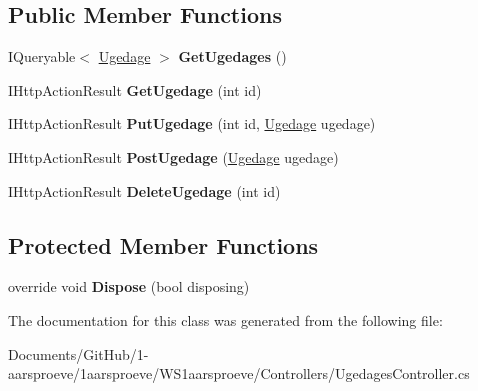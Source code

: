 \subsection*{Public Member Functions}
\begin{DoxyCompactItemize}
\item 
\hypertarget{class_w_s1aarsproeve_1_1_controllers_1_1_ugedages_controller_a6c5ea237cab963d71d3b92f381650efd}{}I\+Queryable$<$ \hyperlink{class_w_s1aarsproeve_1_1_ugedage}{Ugedage} $>$ {\bfseries Get\+Ugedages} ()\label{class_w_s1aarsproeve_1_1_controllers_1_1_ugedages_controller_a6c5ea237cab963d71d3b92f381650efd}

\item 
\hypertarget{class_w_s1aarsproeve_1_1_controllers_1_1_ugedages_controller_a6422d13a3d1b218f8a80454624de486b}{}I\+Http\+Action\+Result {\bfseries Get\+Ugedage} (int id)\label{class_w_s1aarsproeve_1_1_controllers_1_1_ugedages_controller_a6422d13a3d1b218f8a80454624de486b}

\item 
\hypertarget{class_w_s1aarsproeve_1_1_controllers_1_1_ugedages_controller_a13b35b6b510f7b41c9735d13442e3fde}{}I\+Http\+Action\+Result {\bfseries Put\+Ugedage} (int id, \hyperlink{class_w_s1aarsproeve_1_1_ugedage}{Ugedage} ugedage)\label{class_w_s1aarsproeve_1_1_controllers_1_1_ugedages_controller_a13b35b6b510f7b41c9735d13442e3fde}

\item 
\hypertarget{class_w_s1aarsproeve_1_1_controllers_1_1_ugedages_controller_a3283e66107c37bb7d8b144c846f7ff24}{}I\+Http\+Action\+Result {\bfseries Post\+Ugedage} (\hyperlink{class_w_s1aarsproeve_1_1_ugedage}{Ugedage} ugedage)\label{class_w_s1aarsproeve_1_1_controllers_1_1_ugedages_controller_a3283e66107c37bb7d8b144c846f7ff24}

\item 
\hypertarget{class_w_s1aarsproeve_1_1_controllers_1_1_ugedages_controller_a847068aa708fb98fba44c90402e114c4}{}I\+Http\+Action\+Result {\bfseries Delete\+Ugedage} (int id)\label{class_w_s1aarsproeve_1_1_controllers_1_1_ugedages_controller_a847068aa708fb98fba44c90402e114c4}

\end{DoxyCompactItemize}
\subsection*{Protected Member Functions}
\begin{DoxyCompactItemize}
\item 
\hypertarget{class_w_s1aarsproeve_1_1_controllers_1_1_ugedages_controller_a1d06868b337a516e2381b649e6cda4ba}{}override void {\bfseries Dispose} (bool disposing)\label{class_w_s1aarsproeve_1_1_controllers_1_1_ugedages_controller_a1d06868b337a516e2381b649e6cda4ba}

\end{DoxyCompactItemize}


The documentation for this class was generated from the following file\+:\begin{DoxyCompactItemize}
\item 
Documents/\+Git\+Hub/1-\/aarsproeve/1aarsproeve/\+W\+S1aarsproeve/\+Controllers/Ugedages\+Controller.\+cs\end{DoxyCompactItemize}
